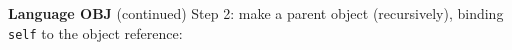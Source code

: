 \begin{minipage}[t]{\sw}
\slidenumber
\LARGE
{\bf Language OBJ} (continued)\exx
Step 2: make a parent object (recursively), binding \verb'self'
to the object reference:\exx
\centerline{}
\end{minipage}
